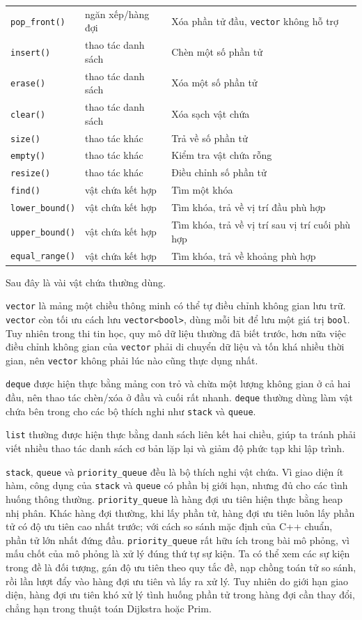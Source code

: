 \documentclass[11pt]{article}
\newcommand{\cpp}{C++}
\begin{document}
\begin{longtable}{p{}p{}p{}}
\verb|pop_front()| & ngăn xếp/hàng đợi & Xóa phần tử đầu, \verb|vector| không hỗ trợ\\
\verb|insert()| & thao tác danh sách & Chèn một số phần tử\\
\verb|erase()| & thao tác danh sách & Xóa một số phần tử\\
\verb|clear()| & thao tác danh sách & Xóa sạch vật chứa\\
\verb|size()| & thao tác khác & Trả về số phần tử\\
\verb|empty()| & thao tác khác & Kiểm tra vật chứa rỗng\\
\verb|resize()| & thao tác khác & Điều chỉnh số phần tử\\
\verb|find()| & vật chứa kết hợp & Tìm một khóa\\
\verb|lower_bound()| & vật chứa kết hợp & Tìm khóa, trả về vị trí đầu phù hợp\\
\verb|upper_bound()| & vật chứa kết hợp & Tìm khóa, trả về vị trí sau vị trí cuối phù hợp\\
\verb|equal_range()| & vật chứa kết hợp & Tìm khóa, trả về khoảng phù hợp\\
\hline
\end{longtable}

Sau đây là vài vật chứa thường dùng.

\verb|vector| là mảng một chiều thông minh có thể tự điều chỉnh không gian
lưu trữ. \verb|vector| còn tối ưu cách lưu \verb|vector<bool>|, dùng mỗi bit
để lưu một giá trị \verb|bool|. Tuy nhiên trong thi tin học, quy mô dữ liệu
thường đã biết trước, hơn nữa việc điều chỉnh không gian của \verb|vector|
phải di chuyển dữ liệu và tốn khá nhiều thời gian, nên \verb|vector| không
phải lúc nào cũng thực dụng nhất.

\verb|deque| được hiện thực bằng mảng con trỏ và chừa một lượng không gian ở
cả hai đầu, nên thao tác chèn/xóa ở đầu và cuối rất nhanh. \verb|deque| thường
dùng làm vật chứa bên trong cho các bộ thích nghi như \verb|stack| và
\verb|queue|.

\verb|list| thường được hiện thực bằng danh sách liên kết hai chiều, giúp ta
tránh phải viết nhiều thao tác danh sách cơ bản lặp lại và giảm độ phức tạp
khi lập trình.

\verb|stack|, \verb|queue| và \verb|priority_queue| đều là bộ thích nghi vật
chứa. Vì giao diện ít hàm, công dụng của \verb|stack| và \verb|queue| có phần
bị giới hạn, nhưng đủ cho các tình huống thông thường. \verb|priority_queue|
là hàng đợi ưu tiên hiện thực bằng heap nhị phân. Khác hàng đợi thường, khi
lấy phần tử, hàng đợi ưu tiên luôn lấy phần tử có độ ưu tiên cao nhất trước;
với cách so sánh mặc định của \cpp{} chuẩn, phần tử lớn nhất đứng đầu.
\verb|priority_queue| rất hữu ích trong bài mô phỏng, vì mấu chốt của mô
phỏng là xử lý đúng thứ tự sự kiện. Ta có thể xem các sự kiện trong đề là đối
tượng, gán độ ưu tiên theo quy tắc đề, nạp chồng toán tử so sánh, rồi lần
lượt đẩy vào hàng đợi ưu tiên và lấy ra xử lý. Tuy nhiên do giới hạn giao
diện, hàng đợi ưu tiên khó xử lý tình huống phần tử trong hàng đợi cần thay
đổi, chẳng hạn trong thuật toán Dijkstra hoặc Prim.
\end{document}
